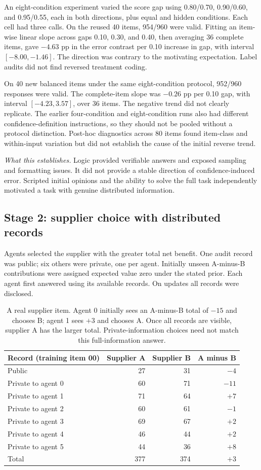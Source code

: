 \documentclass[11pt]{article}
\newcommand{\takeaway}[1]{\par\smallskip\noindent\textit{What this establishes.} #1\par\medskip}
\begin{document}
An eight-condition experiment varied the score gap using 0.80/0.70, 0.90/0.60, and 0.95/0.55, each in both directions, plus equal and hidden conditions. Each cell had three calls. On the reused 40 items, 954/960 were valid. Fitting an item-wise linear slope across gaps 0.10, 0.30, and 0.40, then averaging 36 complete items, gave $-4.63$ pp in the error contrast per 0.10 increase in gap, with interval $[-8.00,-1.46]$. The direction was contrary to the motivating expectation. Label audits did not find reversed treatment coding.

On 40 new balanced items under the same eight-condition protocol, 952/960 responses were valid. The complete-item slope was $-0.26$ pp per 0.10 gap, with interval $[-4.23,3.57]$, over 36 items. The negative trend did not clearly replicate. The earlier four-condition and eight-condition runs also had different confidence-definition instructions, so they should not be pooled without a protocol distinction. Post-hoc diagnostics across 80 items found item-class and within-input variation but did not establish the cause of the initial reverse trend.

\takeaway{Logic provided verifiable answers and exposed sampling and formatting issues. It did not provide a stable direction of confidence-induced error. Scripted initial opinions and the ability to solve the full task independently motivated a task with genuine distributed information.}

\subsection{Stage 2: supplier choice with distributed records}
Agents selected the supplier with the greater total net benefit. One audit record was public; six others were private, one per agent. Initially unseen A-minus-B contributions were assigned expected value zero under the stated prior. Each agent first answered using its available records. On updates all records were disclosed.

\begin{table}[htbp]\centering\small
\begin{tabular}{@{}lrrr@{}}\toprule
Record (training item 00) & Supplier A & Supplier B & A minus B \\\midrule
Public &27&31&$-4$\\
Private to agent 0&60&71&$-11$\\
Private to agent 1&71&64&$+7$\\
Private to agent 2&60&61&$-1$\\
Private to agent 3&69&67&$+2$\\
Private to agent 4&46&44&$+2$\\
Private to agent 5&44&36&$+8$\\\midrule
Total&377&374&$+3$\\\bottomrule
\end{tabular}
\caption{A real supplier item. Agent 0 initially sees an A-minus-B total of $-15$ and chooses B; agent 1 sees $+3$ and chooses A. Once all records are visible, supplier A has the larger total. Private-information choices need not match this full-information answer.}
\end{table}
\end{document}
